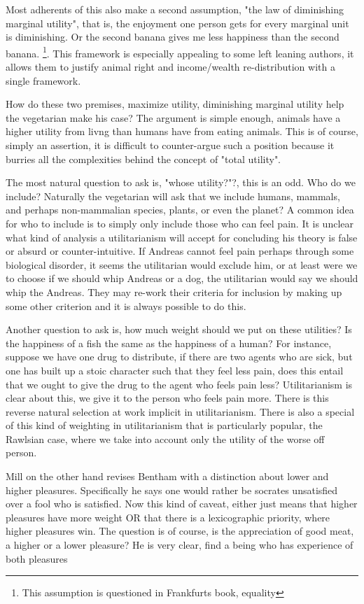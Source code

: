 Most adherents of this also make a second assumption, "the law of diminishing marginal utility", that is, the enjoyment one person gets for every marginal unit is diminishing. Or the second banana gives me less happiness than the second banana. \footnote{This assumption is questioned in Frankfurts book, equality}. This framework is especially appealing to some left leaning authors, it allows them to justify animal right and income/wealth re-distribution with a single framework. 

How do these two premises, maximize utility, diminishing marginal utility help the vegetarian make his case? The argument is simple enough, animals have a higher utility from livng than humans have from eating animals. This is of course, simply an assertion, it is difficult to counter-argue such a position because it burries all the complexities behind the concept of "total utility". 

The most natural question to ask is, "whose utility?"?, this is an odd. Who do we include? Naturally the vegetarian will ask that we include humans, mammals, and perhaps non-mammalian species, plants, or even the planet? A common idea for who to include is to simply only include those who can feel pain. It is unclear what kind of analysis a utilitarianism will accept for concluding his theory is false or absurd or counter-intuitive. If Andreas cannot feel pain perhaps through some biological disorder, it seems the utilitarian would exclude him, or at least were we to choose if we should whip Andreas or a dog, the utilitarian would say we should whip the Andreas.  They may re-work their criteria for inclusion by making up some other criterion and it is always possible to do this. 

Another question to ask is, how much weight should we put on these utilities? Is the happiness of a fish the same as the happiness of a human? For instance, suppose we have one drug to distribute, if there are two agents who are sick, but one has built up a stoic character such that they feel less pain, does this entail that we ought to give the drug to the agent who feels pain less? Utilitarianism is clear about this, we give it to the person who feels pain more. There is this reverse natural selection at work implicit in utilitarianism. There is also a special of this kind of weighting in utilitarianism that is particularly popular, the Rawlsian case, where we take into account only the utility of the worse off person. 

Mill on the other hand revises Bentham with a distinction about lower and higher pleasures. Specifically he says one would rather be socrates unsatisfied over a fool who is satisfied. Now this kind of caveat, either just means that higher pleasures have more weight OR that there is a lexicographic priority, where higher pleasures win. The question is of course, is the appreciation of good meat, a higher or a lower pleasure? He is very clear, find a being who has experience of both pleasures 

